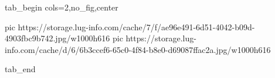  
 
 
 
 


\ifcmt
  tab_begin cols=2,no_fig,center

     pic https://storage.lug-info.com/cache/7/f/ae96e491-6d51-4042-b09d-4903fbc9b742.jpg/w1000h616
		 pic https://storage.lug-info.com/cache/d/6/6b3ccef6-65c0-4f84-b8e0-d69087ffac2a.jpg/w1000h616

  tab_end
\fi
